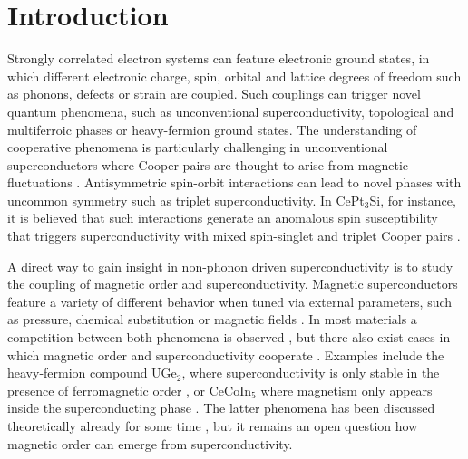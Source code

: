 \documentclass[article,twocolumn,showpacs,preprintnumbers,amsmath,amssymb, superscriptaddress]{revtex4-1}
\begin{document}
\section*{Introduction}

Strongly correlated electron systems can feature electronic ground states, in which different electronic charge, spin, orbital and lattice degrees of freedom such as phonons, defects or strain are coupled. Such couplings can trigger novel quantum phenomena, such as unconventional superconductivity, topological and multiferroic phases or heavy-fermion ground states. The understanding of cooperative phenomena is particularly challenging in unconventional superconductors where Cooper pairs are thought to arise from magnetic fluctuations \cite{Monthoux2007}. Antisymmetric spin-orbit interactions can lead to novel phases with uncommon symmetry such as triplet superconductivity.  In CePt$_3$Si, for instance, it is believed that such interactions generate an anomalous spin susceptibility that triggers superconductivity with mixed spin-singlet and triplet Cooper pairs \cite{Frigeri2004, Fak2014}. 

A direct way to gain insight in non-phonon driven superconductivity is to study the coupling of magnetic order and superconductivity. Magnetic superconductors feature a variety of different behavior when tuned via external parameters, such as pressure, chemical substitution or magnetic fields \cite{Norman2011, Pfleiderer2009, White2015}. In most materials a competition between both phenomena is observed \cite{Norman2011, Pfleiderer2009, White2015}, but there also exist cases in which magnetic order and superconductivity cooperate \cite{Huxley2015, Kenzelmann2008, Kenzelmann2017}. Examples include the heavy-fermion compound UGe$_2$, where superconductivity is only stable in the presence of ferromagnetic order \cite{Huxley2015}, or CeCoIn$_5$ where magnetism  only appears inside the superconducting phase \cite{Kenzelmann2008, Kenzelmann2017}. The latter phenomena has been discussed theoretically already for some time \cite{Fulde1964, Larkin1965, Psaltakis1983, Shimahara2000, Lebed2006, Aperis2008, Yanase2009, Kato2011, Suzuki2011, Agterberg2009, Michal2011, Mineev2016, Kim20172, Hatakeyama2015, Hosoya2017}, but it remains an open question how magnetic order can emerge from superconductivity. 
\end{document}
